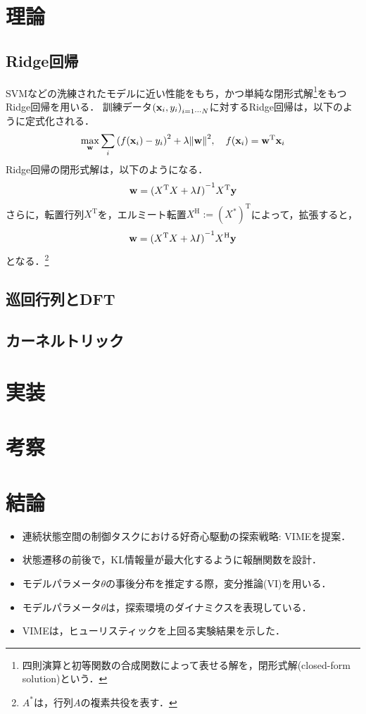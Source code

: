\documentclass[11pt,a4j]{jarticle}
\newcommand\norm[1]{\left\lVert#1\right\rVert}
\begin{document}
  \section{理論}
    \subsection{Ridge回帰}
      SVMなどの洗練されたモデルに近い性能をもち，かつ単純な閉形式解\footnote{四則演算と初等関数の合成関数によって表せる解を，閉形式解(closed-form solution)という．}をもつRidge回帰を用いる．
      訓練データ${({\bf x}_i, y_i)}_{i = 1 \cdots N}$に対するRidge回帰は，以下のように定式化される．
      \begin{align}
        \max_{\bf w} \sum_{i} { \left( f({\bf x}_i) - y_i \right) }^{2} + \lambda {\norm{ \bf w }}^{2}, ~~~
        f({\bf x}_i) = {\bf w}^{\mathrm{T}} {\bf x}_i
      \end{align}
      Ridge回帰の閉形式解は，以下のようになる．
      \begin{align}
        {\bf w} = { ({X}^{\mathrm{T}} X + \lambda I) }^{-1} {X}^{\mathrm{T}} {\bf y}
      \end{align}
      さらに，転置行列$X^{\mathrm{T}}$を，エルミート転置$X^{\mathrm{H}} := {(X^{*})}^{\mathrm{T}}$によって，拡張すると，
      \begin{align}
        {\bf w} = { ({X}^{\mathrm{T}} X + \lambda I) }^{-1} {X}^{\mathrm{H}} {\bf y}
      \end{align}
      となる．\footnote{$A^{*}$は，行列$A$の複素共役を表す．}
    \subsection{巡回行列とDFT}

    \subsection{カーネルトリック}
  \section{実装}
  \section{考察}
  \section{結論}
    \begin{itemize}
      \item 連続状態空間の制御タスクにおける好奇心駆動の探索戦略: VIMEを提案．
      \item 状態遷移の前後で，KL情報量が最大化するように報酬関数を設計．
      \item モデルパラメータ$\theta$の事後分布を推定する際，変分推論(VI)を用いる．
      \item モデルパラメータ$\theta$は，探索環境のダイナミクスを表現している．
      \item VIMEは，ヒューリスティックを上回る実験結果を示した．
    \end{itemize}

\end{document}
